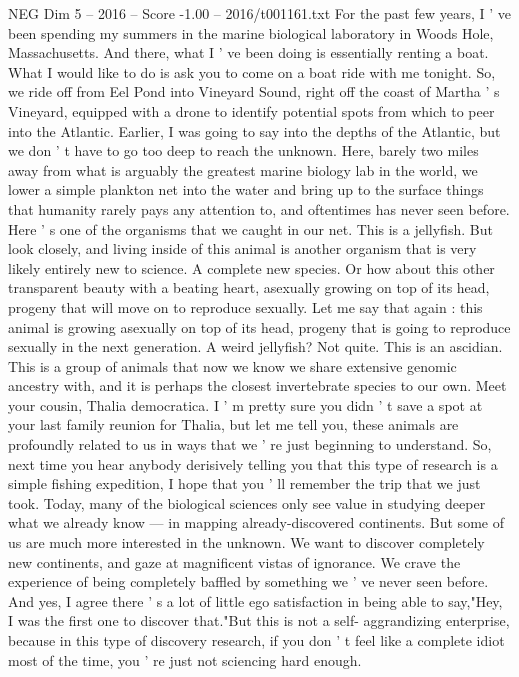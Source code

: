 \begin{textsample}{NEG Dim 5 – 2016 – Score -1.00 – 2016/t001161.txt}  \label{ex:f5_neg_027}
For the past few years, I ' ve been spending my summers in the marine biological laboratory in Woods Hole, Massachusetts.
And there, what I ' ve been doing is essentially renting a boat.
What I would like to do is ask you to come on a boat ride with me tonight.
So, we ride off from Eel Pond into Vineyard Sound, right off the coast of Martha ' s Vineyard, equipped with a drone to identify potential spots from which to peer into the Atlantic.
Earlier, I was going to say into the depths of the Atlantic, but we don ' t have to go too deep to reach the unknown.
Here, barely two miles away from what is arguably the greatest marine biology lab in the world, we lower a simple plankton net into the water and bring up to the surface things that humanity rarely pays any attention to, and oftentimes has never seen before.
Here ' s one of the organisms that we caught in our net.
This is a jellyfish.
But look closely, and living inside of this animal is another organism that is very likely entirely new to science.
A complete new species.
Or how about this other transparent beauty with a beating heart, asexually growing on top of its head, progeny that will move on to reproduce sexually.
Let me say that again : this animal is growing asexually on top of its head, progeny that is going to reproduce sexually in the next generation.
A weird jellyfish?
Not quite.
This is an ascidian.
This is a group of animals that now we know we share extensive genomic ancestry with, and it is perhaps the closest invertebrate species to our own.
Meet your cousin, Thalia democratica.
I ' m pretty sure you didn ' t save a spot at your last family reunion for Thalia, but let me tell you, these animals are profoundly related to us in ways that we ' re just beginning to understand.
So, next time you hear anybody derisively telling you that this type of research is a simple fishing expedition, I hope that you ' ll remember the trip that we just took.
Today, many of the biological sciences only see value in studying deeper what we already know — in mapping already-discovered continents.
But some of us are much more interested in the unknown.
We want to discover completely new continents, and gaze at magnificent vistas of ignorance.
We crave the experience of being completely baffled by something we ' ve never seen before.
And yes, I agree there ' s a lot of little ego satisfaction in being able to say,"Hey, I was the first one to discover that."But this is not a self- aggrandizing enterprise, because in this type of discovery research, if you don ' t feel like a complete idiot most of the time, you ' re just not sciencing hard enough.

\end{textsample}
